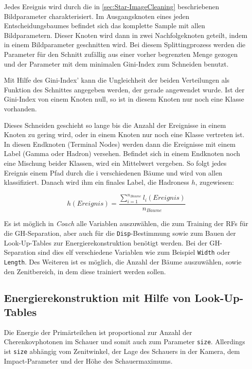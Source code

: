 Jedes Ereignis wird durch die in \autoref{sec:Star-ImageCleaning} beschriebenen Bildparameter charakterisiert.
Im Ausgangsknoten eines jeden Entscheidungsbaumes befindet sich das komplette Sample mit allen Bildparametern.
Dieser Knoten wird dann in zwei Nachfolgeknoten geteilt, indem in einem Bildparameter geschnitten wird.
Bei diesem Splittingprozess werden die  Parameter für den Schnitt zufällig aus einer vorher begrenzten Menge gezogen und der Parameter mit dem minimalen Gini-Index zum Schneiden benutzt.

Mit Hilfe des Gini-Index' kann die Ungleichheit der beiden Verteilungen als Funktion des Schnittes angegeben werden, der gerade angewendet wurde.
Ist der Gini-Index von einem Knoten null, so ist in diesem Knoten nur noch eine Klasse vorhanden.

Dieses Schneiden geschieht so lange bis die Anzahl der Ereignisse in einem Knoten zu gering wird, oder in einem Knoten nur noch eine Klasse vertreten ist.
In diesen Endknoten (Terminal Nodes) werden dann die Ereignisse mit einem Label (Gamma oder Hadron) versehen. 
Befindet sich in einem Endknoten noch eine Mischung beider Klassen, wird ein Mittelwert vergeben.
So folgt jedes Ereignis einem Pfad durch die i verschiedenen Bäume und wird von allen klassifiziert.
Danach wird ihm ein finales Label, die Hadroness $h$, zugewiesen:

\begin{equation}
 h(Ereignis)=\frac{ \sum_{i=1} ^{n_{B\ddot{a}ume}} l_i(Ereignis)}{n_{B\ddot{a}ume}}
\end{equation}

Es ist möglich in \textit{Coach} alle Variablen auszuwählen, die zum Training der RFs für die GH-Separation, aber auch für die \texttt{Disp}-Bestimmung sowie zum Bauen der Look-Up-Tables zur Energierekonstruktion benötigt werden.
Bei der GH-Separation sind dies elf verschiedene Variablen wie zum Beispiel \texttt{Width} oder \texttt{Length}.
Des Weiteren ist es möglich, die Anzahl der Bäume auszuwählen, sowie den Zenitbereich, in dem diese trainiert werden sollen.

\subsection{Energierekonstruktion mit Hilfe von Look-Up-Tables}
Die Energie der Primärteilchen ist proportional zur Anzahl der Cherenkovphotonen im Schauer und somit auch zum Parameter \texttt{size}.
Allerdings ist \texttt{size} abhängig vom Zenitwinkel, der Lage des Schauers in der Kamera, dem Impact-Parameter und der Höhe des Schauermaximums.

